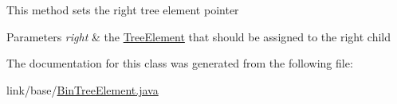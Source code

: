 This method sets the right tree element pointer 
\begin{DoxyParams}{Parameters}
{\em right} & the \hyperlink{classbridges_1_1base_1_1_tree_element}{Tree\+Element} that should be assigned to the right child \\
\hline
\end{DoxyParams}


The documentation for this class was generated from the following file\+:\begin{DoxyCompactItemize}
\item 
link/base/\hyperlink{_bin_tree_element_8java}{Bin\+Tree\+Element.\+java}\end{DoxyCompactItemize}
